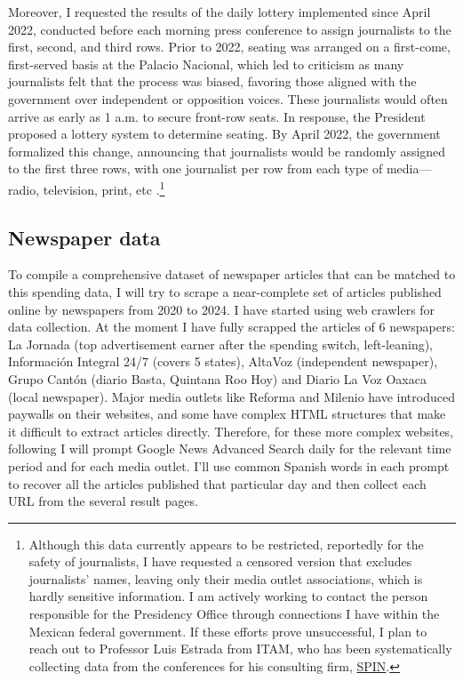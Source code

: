 Moreover, I requested the results of the daily lottery implemented since April 2022, conducted before each morning press conference to assign journalists to the first, second, and third rows. Prior to 2022, seating was arranged on a first-come, first-served basis at the Palacio Nacional, which led to criticism as many journalists felt that the process was biased, favoring those aligned with the government over independent or opposition voices\citep{Tombola-Razon}. These journalists would often arrive as early as 1 a.m. to secure front-row seats. In response, the President proposed a lottery system to determine seating. By April 2022, the government formalized this change, announcing that journalists would be randomly assigned to the first three rows, with one journalist per row from each type of media—radio, television, print, etc \citep{Tombola-Financiero}.\footnote{Although this data currently appears to be restricted, reportedly for the safety of journalists, I have requested a censored version that excludes journalists' names, leaving only their media outlet associations, which is hardly sensitive information. I am actively working to contact the person responsible for the Presidency Office through connections I have within the Mexican federal government. If these efforts prove unsuccessful, I plan to reach out to Professor Luis Estrada from ITAM, who has been systematically collecting data from the conferences for his consulting firm, \href{https://spintcp.com/quienes-somos/}{SPIN}.}

\subsection{Newspaper data}

To compile a comprehensive dataset of newspaper articles that can be matched to this spending data, I will try to scrape a near-complete set of articles published online by newspapers from 2020 to 2024. I have started using web crawlers for data collection. At the moment I have fully scrapped the articles of 6 newspapers: La Jornada (top advertisement earner after the spending switch, left-leaning), Información Integral 24/7 (covers 5 states), AltaVoz (independent newspaper), Grupo Cantón (diario Basta, Quintana Roo Hoy) and Diario La Voz Oaxaca (local newspaper). Major media outlets like Reforma and Milenio have introduced paywalls on their websites, and some have complex HTML structures that make it difficult to extract articles directly. Therefore, for these more complex websites, following \cite{SobrinoCartel, Marshall} I will prompt Google News Advanced Search daily for the relevant time period and for each media outlet. I'll use common Spanish words in each prompt to recover all the articles published that particular day and then collect each URL from the several result pages. 

